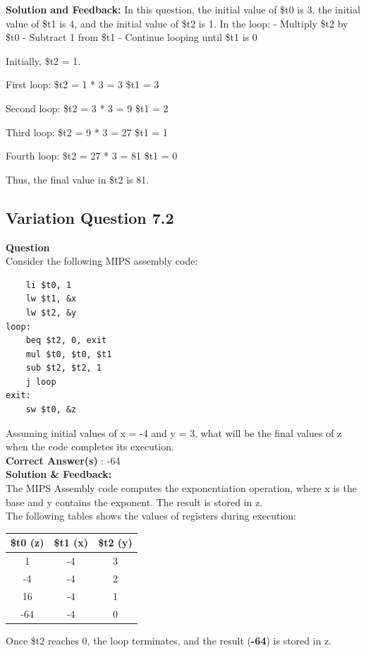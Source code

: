 \textbf{Solution and Feedback:}
In this question, the initial value of \$t0 is 3, the initial value of \$t1 is 4, and the initial value of \$t2 is 1. 
In the loop:
- Multiply \$t2 by \$t0
- Subtract 1 from \$t1
- Continue looping until \$t1 is 0

Initially, \$t2 = 1.

First loop:
\$t2 = 1 * 3 = 3
\$t1 = 3

Second loop:
\$t2 = 3 * 3 = 9
\$t1 = 2

Third loop:
\$t2 = 9 * 3 = 27
\$t1 = 1

Fourth loop:
\$t2 = 27 * 3 = 81
\$t1 = 0

Thus, the final value in \$t2 is 81.

\subsection{Variation Question 7.2}

\textbf{Question} \\
Consider the following MIPS assembly code:
\begin{lstlisting}
    li $t0, 1
    lw $t1, &x
    lw $t2, &y
loop:
    beq $t2, 0, exit
    mul $t0, $t0, $t1
    sub $t2, $t2, 1
    j loop
exit:
    sw $t0, &z
\end{lstlisting}

Assuming initial values of x = -4 and y = 3, what will be the final values of z when the code completes its execution.\\

\textbf{Correct Answer(s)} : -64  \\
\noindent \textbf{Solution \& Feedback:} \\
\noindent The MIPS Assembly code computes the exponentiation operation, where x is the base and y contains the exponent. The result is stored in z.\\
\noindent The following tables shows the values of registers during execution:

\begin{tabular}{|c|c|c|}
\hline
\textbf{\$t0 (z)} & \textbf{\$t1 (x)} & \textbf{\$t2 (y)} \\
\hline
1 & -4 & 3 \\
\hline
-4 & -4 & 2 \\
\hline
16 & -4 & 1 \\
\hline
-64 & -4 & 0 \\
\hline
\end{tabular}

\noindent Once \$t2 reaches 0, the loop terminates, and the result (\textbf{-64}) is stored in z.

